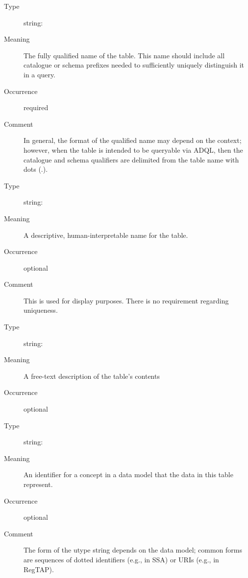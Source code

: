 \documentclass[11pt,a4paper]{ivoa}
\begin{document}
\begin{generated}
\begingroup\small\begin{bigdescription}\item[Element \xmlel{name}]
\begin{description}
\item[Type] string: 
\item[Meaning] The fully qualified name of the table.  This name
                  should include all catalogue or schema prefixes
                  needed to sufficiently uniquely distinguish it in a
                  query.
\item[Occurrence] required
\item[Comment] In general, the format of the qualified name may
                  depend on the context; however, when the
                  table is intended to be queryable via ADQL, then the
                  catalogue and schema qualifiers are delimited from the
                  table name with dots (.).

\end{description}
\item[Element \xmlel{title}]
\begin{description}
\item[Type] string: 
\item[Meaning] A descriptive, human-interpretable name for the table.
\item[Occurrence] optional
\item[Comment] This is used for display purposes.  There is no requirement
                  regarding uniqueness.

\end{description}
\item[Element \xmlel{description}]
\begin{description}
\item[Type] string: 
\item[Meaning] A free-text description of the table's contents
\item[Occurrence] optional

\end{description}
\item[Element \xmlel{utype}]
\begin{description}
\item[Type] string: 
\item[Meaning] An identifier for a concept in a data model that
                  the data in this table represent.
\item[Occurrence] optional
\item[Comment] The form of the utype string depends on the data
                  model; common forms are sequences of dotted identifiers
                  (e.g., in SSA) or URIs (e.g., in RegTAP).


\end{description}
\end{bigdescription}
\end{generated}
\end{document}
